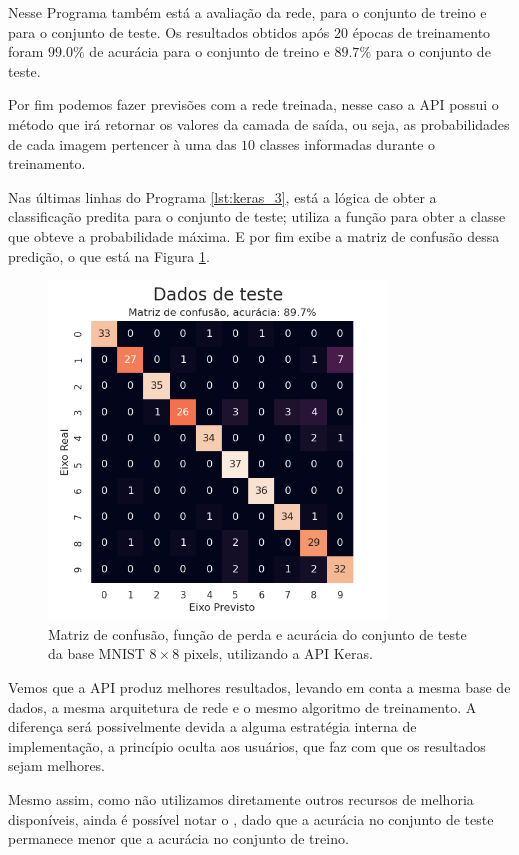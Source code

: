 Nesse Programa também está a avaliação da rede, para o conjunto de treino e para o conjunto de teste. Os resultados obtidos após $20$ épocas de treinamento foram $99.0\%$ de acurácia para o conjunto de treino e $89.7\%$ para o conjunto de teste. 

Por fim podemos fazer previsões com a rede treinada, nesse caso a API possui o método  que irá retornar os valores da camada de saída, ou seja, as probabilidades de cada imagem pertencer à uma das $10$ classes informadas durante o treinamento.

Nas últimas linhas do Programa \ref{lst:keras_3}, está a lógica de obter a classificação predita para o conjunto de teste; utiliza a função  para obter a classe que obteve a probabilidade máxima. E por fim exibe a matriz de confusão dessa predição, o que está na Figura \ref{fig:keras_test}.

\begin{figure}[htb]
\centering
\includegraphics[width=9cm]{figuras/keras_test}
\caption{Matriz de confusão, função de perda e acurácia do conjunto de teste da base MNIST ${8\times8}$ pixels, utilizando a API Keras.}
\label{fig:keras_test}
\end{figure}

Vemos que a API produz melhores resultados, levando em conta a mesma base de dados, a mesma arquitetura de rede e o mesmo algoritmo de treinamento. A diferença será possivelmente devida a alguma estratégia interna de implementação, a princípio oculta aos usuários, que faz com que os resultados sejam melhores. 

Mesmo assim, como não utilizamos diretamente outros recursos de melhoria disponíveis, ainda é possível notar o , dado que a acurácia no conjunto de teste permanece menor que a acurácia no conjunto de treino. 

